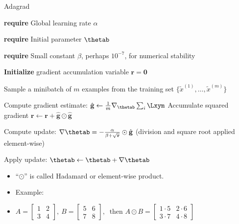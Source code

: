 \begin{vbframe}{Adagrad}
  
  \begin{algorithm}[H]
    \small
    \caption{Adagrad}
    \begin{algorithmic}[1]
    \scriptsize 
    \State \textbf{require} Global learning rate $\alpha$ \strut
    \State \textbf{require} Initial parameter $\thetab$ \strut
    \State \textbf{require} Small constant $\beta$, perhaps $10^{-7}$, for numerical stability \strut
    \State \textbf{Initialize} gradient accumulation variable $\mathbf{r} = \mathbf{0} $
         \State \parbox[t]{\dimexpr\linewidth-\algorithmicindent}{Sample a minibatch of $m$ examples from the training set $\{\tilde{x}^{(1)},\dots,\tilde{x}^{(m)}\}$ \strut}
         \State Compute gradient estimate: $\hat{\mathbf{g}} \leftarrow \frac{1}{m} \nabla_{\thetab} \sum_{i} \Lxym$
         \State Accumulate squared gradient $\mathbf{r} \leftarrow \mathbf{r} + \hat{\mathbf{g}} \odot  \hat{\mathbf{g}}$
         \State \parbox[t]{\dimexpr\linewidth-\algorithmicindent}{Compute update: $\nabla \thetab = - \frac{\alpha}{\beta + \sqrt\mathbf{r}} \odot \hat{\mathbf{g}}$ (division and square root applied element-wise) \strut}
         \State Apply update: $\thetab \leftarrow \thetab + \nabla\thetab$
       \EndWhile
    \end{algorithmic}
  \end{algorithm}
  \begin{itemize}
  \small
    \item \enquote{$\odot$} is called Hadamard or element-wise product.
    \item Example:
    \vspace{0.2cm}
    \item[] $A =
            \begin{bmatrix}
              1 & 2 \\
              3 & 4
            \end{bmatrix}, \ 
            B =
            \begin{bmatrix}
              5 & 6 \\
              7 & 8
            \end{bmatrix}, \ \text{ then } A \odot B =
            \begin{bmatrix}
              1 \cdot 5 & 2 \cdot 6 \\
              3 \cdot 7 & 4 \cdot 8
            \end{bmatrix}$
  \end{itemize}
\end{vbframe}

